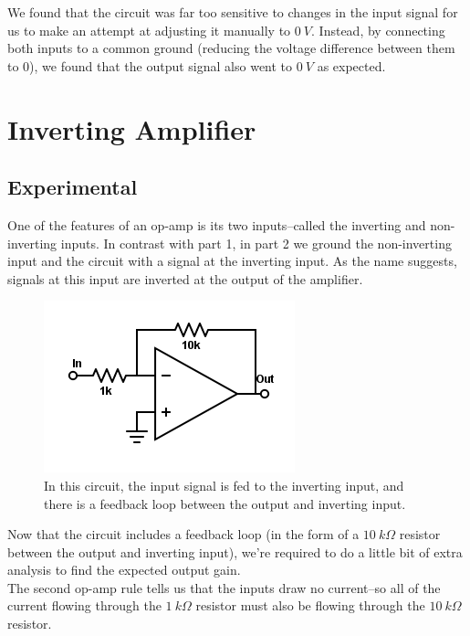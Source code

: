 \documentclass[11pt]{article}
\begin{document}
We found that the circuit was far too sensitive to changes in the input signal for us to make an attempt at adjusting it manually to $0\ V$. Instead, by connecting both inputs to a common ground (reducing the voltage difference between them to 0), we found that the output signal also went to $0\ V$ as expected.\\


\section{Inverting Amplifier}
\subsection{Experimental}

One of the features of an op-amp is its two inputs--called the inverting and non-inverting inputs. In contrast with part 1, in part 2 we ground the non-inverting input and the circuit with a signal at the inverting input. As the name suggests, signals at this input are inverted at the output of the amplifier.\\

\begin{figure}[H]
    \centering
    \includegraphics[scale=0.5]{Diagrams/c-b.png}
    \caption{In this circuit, the input signal is fed to the inverting input, and there is a feedback loop between the output and inverting input.}
    \label{circuit:b}
\end{figure}

Now that the circuit includes a feedback loop (in the form of a $10\ k \Omega$ resistor between the output and inverting input), we're required to do a little bit of extra analysis to find the expected output gain.\\

The second op-amp rule tells us that the inputs draw no current--so all of the current flowing through the $1\ k \Omega$ resistor must also be flowing through the $10\ k \Omega$ resistor. \\
\end{document}
